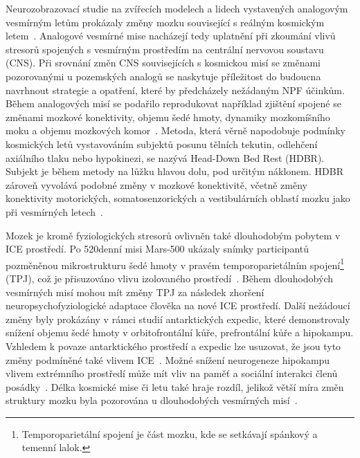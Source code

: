 Neurozobrazovací studie na zvířecích modelech a lidech vystavených analogovým
vesmírným letům prokázaly změny mozku související s reálným kosmickým
letem~\cite{Kramer2020,Correia1998}. Analogové vesmírné mise nacházejí tedy
uplatnění při zkoumání vlivů stresorů spojených s vesmírným prostředím na
centrální nervovou soustavu (CNS). Při srovnání změn CNS souvisejících s
kosmickou misí se změnami pozorovanými u pozemských analogů se naskytuje
příležitost do budoucna navrhnout strategie a opatření, které by předcházely
nežádaným NPF účinkům. Během analogových misí se podařilo reprodukovat například
zjištění spojené se změnami mozkové konektivity, objemu šedé hmoty, dynamiky
mozkomíšního moku a objemu mozkových komor~\cite{Roy2021}. Metoda, která věrně
napodobuje podmínky kosmických letů vystavováním subjektů posunu tělních
tekutin, odlehčení axiálního tlaku nebo hypokinezi, se nazývá Head-Down Bed Rest
(\gls{HDBR}). Subjekt je během metody na lůžku hlavou dolu, pod určitým
náklonem. HDBR zároveň vyvolává podobné změny v mozkové konektivitě, včetně
změny konektivity motorických, somatosenzorických a vestibulárních oblastí mozku
jako při vesmírných letech~\cite{Koppelmans2016, Koppelmans2017}.

Mozek je kromě fyziologických stresorů ovlivněn také dlouhodobým pobytem v
\gls{ICE} prostředí. Po 520denní misi Mars-500 ukázaly snímky participantů
pozměněnou mikrostrukturu šedé hmoty v pravém temporoparietálním
spojení\footnote{Temporoparietální spojení je část mozku, kde se setkávají
spánkový a temenní lalok.} (\gls{TPJ}), což je přisuzováno vlivu izolovaného
prostředí~\cite{Brem2020}. Během dlouhodobých vesmírných misí mohou mít změny
TPJ za následek zhoršení neuropsychofyziologické adaptace člověka na nové ICE
prostředí. Další nežádoucí změny byly prokázány v rámci studií antarktických
expedic, které demonstrovaly snížení objemu šedé hmoty v orbitofrontální kůře,
prefrontální kůře a hipokampu. Vzhledem k povaze antarktického prostředí a
expedic lze usuzovat, že jsou tyto změny podmíněné také vlivem
\gls{ICE}~\cite{Stahn2019}. Možné snížení neurogeneze hipokampu vlivem
extrémního prostředí může mít vliv na paměť a sociální interakci členů
posádky~\cite{Roy2021}. Délka kosmické mise či letu také hraje rozdíl, jelikož
větší míra změn struktury mozku byla pozorována u dlouhodobých vesmírných
misí~\cite{Roberts2017}.